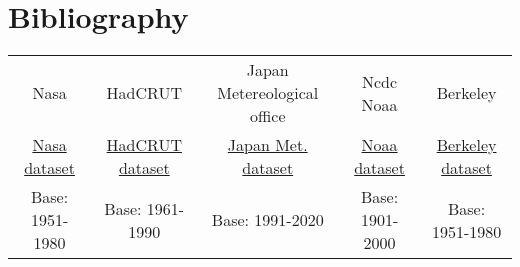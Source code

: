 \documentclass[a4paper,11pt,rmp,superscriptaddress]{revtex4}
\begin{document}
\section*{Bibliography}


\begin{tabular}{ c c c c c }
    Nasa    &   HadCRUT     &   Japan Metereological office     &   Ncdc Noaa   &   Berkeley \\
    \href{https://data.giss.nasa.gov/gistemp/graphs_v4/graph_data/Global_Mean_Estimates_based_on_Land_and_Ocean_Data/graph.txt}{Nasa dataset} & 
    \href{https://www.metoffice.gov.uk/hadobs/hadcrut5/data/current/download.html} {HadCRUT dataset} &
    \href{https://ds.data.jma.go.jp/tcc/tcc/products/gwp/temp/list/csv/year_wld.csv}{Japan Met. dataset} &
    \href{https://www.ncdc.noaa.gov/cag/global/time-series/globe/land_ocean/12/12/1880-2023/data.csv}{Noaa dataset} &
    \href{https://ds.data.jma.go.jp/tcc/tcc/products/gwp/temp/list/csv/year_wld.csv}{Berkeley dataset} \\
    Base: 1951-1980      &      Base: 1961-1990      & Base: 1991-2020      & Base: 1901-2000    & Base: 1951-1980
\end{tabular}
\end{document}
